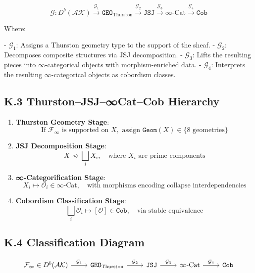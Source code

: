 \documentclass[11pt]{article}
\begin{document}
\[
\mathcal{G} : D^b(\mathcal{AK}) \xrightarrow{\mathcal{G}_1} \texttt{GEO}_{\text{Thurston}} 
\xrightarrow{\mathcal{G}_2} \texttt{JSJ} \xrightarrow{\mathcal{G}_3} \infty\text{-Cat} 
\xrightarrow{\mathcal{G}_4} \texttt{Cob}
\]

Where:

- \( \mathcal{G}_1 \): Assigns a Thurston geometry type to the support of the sheaf.
- \( \mathcal{G}_2 \): Decomposes composite structures via JSJ decomposition.
- \( \mathcal{G}_3 \): Lifts the resulting pieces into $\infty$-categorical objects with morphism-enriched data.
- \( \mathcal{G}_4 \): Interprets the resulting $\infty$-categorical objects as cobordism classes.

\subsection*{K.3 Thurston–JSJ–∞Cat–Cob Hierarchy}

\begin{enumerate}
  \item \textbf{Thurston Geometry Stage}:
  \[
  \text{If } \mathcal{F}_\infty \text{ is supported on } X, \text{ assign } \texttt{Geom}(X) \in \{ \text{8 geometries} \}
  \]

  \item \textbf{JSJ Decomposition Stage}:
  \[
  X \rightsquigarrow \bigsqcup_i X_i, \quad \text{where } X_i \text{ are prime components}
  \]

  \item \textbf{∞-Categorification Stage}:
  \[
  X_i \mapsto \mathcal{O}_i \in \infty\text{-Cat}, \quad \text{with morphisms encoding collapse interdependencies}
  \]

  \item \textbf{Cobordism Classification Stage}:
  \[
  \bigsqcup_i \mathcal{O}_i \longmapsto [\mathcal{O}] \in \texttt{Cob}, \quad \text{via stable equivalence}
  \]
\end{enumerate}

\subsection*{K.4 Classification Diagram}

\[
\begin{tikzcd}
\mathcal{F}_\infty \in D^b(\mathcal{AK}) \arrow[r, "\mathcal{G}_1"] & \texttt{GEO}_{\text{Thurston}} \arrow[r, "\mathcal{G}_2"] & \texttt{JSJ} \arrow[r, "\mathcal{G}_3"] & \infty\text{-Cat} \arrow[r, "\mathcal{G}_4"] & \texttt{Cob}
\end{tikzcd}
\]
\end{document}
